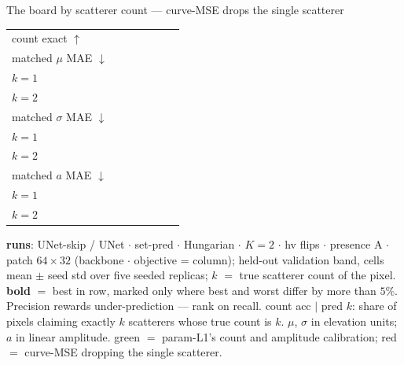 \begin{frame}{The board by scatterer count --- curve-MSE drops the single scatterer}
\begin{tabular}{@{}l c c c c c !{\hspace{3pt}} c@{}}
    count exact $\uparrow$ &  &  &  &  &  &  \\
    \addlinespace
    matched $\mu$ MAE $\downarrow$ &  &  &  &  &  &  \\
    \quad $k{=}1$ &  &  &  &  &  &  \\
    \quad $k{=}2$ &  &  &  &  &  &  \\
    \addlinespace
    matched $\sigma$ MAE $\downarrow$ &  &  &  &  &  &  \\
    \quad $k{=}1$ &  &  &  &  &  &  \\
    \quad $k{=}2$ &  &  &  &  &  &  \\
    \addlinespace
    matched $a$ MAE $\downarrow$ &  &  &  &  &  &  \\
    \quad $k{=}1$ &  &  &  &  &  &  \\
    \quad $k{=}2$ &  &  &  &  &  &  \\
    \bottomrule
  \end{tabular}
  \par\vspace{3pt}
  \parbox{0.82\textwidth}{\tiny\color{soft} \textbf{runs}: UNet-skip / UNet $\cdot$ set-pred $\cdot$
   Hungarian $\cdot$ $K{=}2$ $\cdot$ hv flips $\cdot$ presence A $\cdot$ patch
   $64{\times}32$ (backbone $\cdot$ objective = column); held-out validation band,
   cells mean $\pm$ seed std over five seeded replicas; $k$ $=$ true scatterer
   count of the pixel. \textbf{bold} $=$ best in row, marked only where best and worst differ by more than $5\%$. Precision rewards
   under-prediction --- rank on recall. count acc $\mid$ pred $k$: share of pixels
   claiming exactly $k$ scatterers whose true count is $k$. $\mu$, $\sigma$ in
   elevation units; $a$ in linear amplitude. \textcolor{good}{green} $=$ param-L1's count and amplitude calibration; \textcolor{accent}{red} $=$ curve-MSE dropping the single scatterer.\par}
    


\end{frame}
